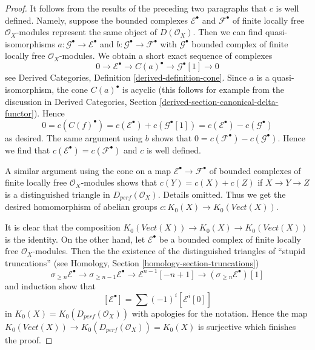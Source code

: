 \documentclass{stacks-project}
\theoremstyle{plain}
\theoremstyle{definition}
\theoremstyle{remark}
\numberwithin{equation}{subsection}
\begin{document}
\begin{proof}
\medskip\noindent
It follows from the results of the preceding two paragraphs that $c$
is well defined. Namely, suppose the bounded complexes
$\mathcal{E}^\bullet$ and $\mathcal{F}^\bullet$ of finite locally free
$\mathcal{O}_X$-modules represent the same object of $D(\mathcal{O}_X)$.
Then we can find quasi-isomorphisms
$a : \mathcal{G}^\bullet \to \mathcal{E}^\bullet$ and
$b : \mathcal{G}^\bullet \to \mathcal{F}^\bullet$
with $\mathcal{G}^\bullet$ bounded complex of finite locally free
$\mathcal{O}_X$-modules.
We obtain a short exact sequence of complexes
$$
0 \to \mathcal{E}^\bullet \to C(a)^\bullet \to \mathcal{G}^\bullet[1] \to 0
$$
see Derived Categories, Definition \ref{derived-definition-cone}.
Since $a$ is a quasi-isomorphism, the cone $C(a)^\bullet$ is
acyclic (this follows for example from the discussion in
Derived Categories, Section \ref{derived-section-canonical-delta-functor}).
Hence
$$
0 = c(C(f)^\bullet) = c(\mathcal{E}^\bullet) + c(\mathcal{G}^\bullet[1]) =
c(\mathcal{E}^\bullet) - c(\mathcal{G}^\bullet)
$$
as desired. The same argument using $b$ shows that
$0 = c(\mathcal{F}^\bullet) - c(\mathcal{G}^\bullet)$.
Hence we find that $c(\mathcal{E}^\bullet) = c(\mathcal{F}^\bullet)$
and $c$ is well defined.

\medskip\noindent
A similar argument using the cone on a map
$\mathcal{E}^\bullet \to \mathcal{F}^\bullet$
of bounded complexes of finite locally free $\mathcal{O}_X$-modules
shows that $c(Y) = c(X) + c(Z)$ if $X \to Y \to Z$ is a distinguished triangle
in $D_{perf}(\mathcal{O}_X)$. Details omitted.
Thus we get the desired homomorphism
of abelian groups $c : K_0(X) \to K_0(\textit{Vect}(X))$.

\medskip\noindent
It is clear that the composition
$K_0(\textit{Vect}(X)) \to K_0(X) \to K_0(\textit{Vect}(X))$
is the identity. On the other hand, let $\mathcal{E}^\bullet$
be a bounded complex of finite locally free $\mathcal{O}_X$-modules.
Then the the existence of the distinguished triangles
of ``stupid truncations''
(see Homology, Section \ref{homology-section-truncations})
$$
\sigma_{\geq n}\mathcal{E}^\bullet \to
\sigma_{\geq n - 1}\mathcal{E}^\bullet \to
\mathcal{E}^{n - 1}[-n + 1] \to
(\sigma_{\geq n}\mathcal{E}^\bullet)[1]
$$
and induction show that
$$
[\mathcal{E}^\bullet] = \sum (-1)^i[\mathcal{E}^i[0]]
$$
in $K_0(X) = K_0(D_{perf}(\mathcal{O}_X))$ with apologies for the notation.
Hence the map $K_0(\textit{Vect}(X)) \to K_0(D_{perf}(\mathcal{O}_X)) = K_0(X)$
is surjective which finishes the proof.
\end{proof}
\end{document}
